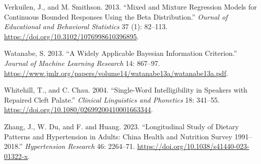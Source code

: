 \documentclass[
sn-apacite
]{sn-jnl}
\newlength{\cslhangindent}
\newenvironment{CSLReferences}[2] %
 {\begin{list}{}{%
  \setlength{\itemindent}{0pt}
  \setlength{\leftmargin}{0pt}
  \setlength{\parsep}{0pt}
  \ifodd #1
   \setlength{\leftmargin}{\cslhangindent}
   \setlength{\itemindent}{-1\cslhangindent}
  \fi
  \setlength{\itemsep}{#2\baselineskip}}}
 {\end{list}}
\begin{document}
\begin{CSLReferences}{1}{0}
Verkuilen, J., and M. Smithson. 2013. {``Mixed and Mixture Regression
Models for Continuous Bounded Responses Using the Beta Distribution.''}
\emph{Ournal of Educational and Behavioral Statistics} 37 (1): 82--113.
\url{https://doi.org/10.3102/1076998610396895}.

Watanabe, S. 2013. {``A Widely Applicable Bayesian Information
Criterion.''} \emph{Journal of Machine Learning Research} 14: 867--97.
\url{https://www.jmlr.org/papers/volume14/watanabe13a/watanabe13a.pdf}.

Whitehill, T., and C. Chau. 2004. {``Single-Word Intelligibility in
Speakers with Repaired Cleft Palate.''} \emph{Clinical Linguistics and
Phonetics} 18: 341--55.
\url{https://doi.org/10.1080/02699200410001663344}.

Zhang, J., W. Du, and F. and Huang. 2023. {``Longitudinal Study of
Dietary Patterns and Hypertension in Adults: China Health and Nutrition
Survey 1991--2018.''} \emph{Hypertension Research} 46: 2264--71.
\url{https://doi.org/10.1038/s41440-023-01322-x}.

\end{CSLReferences}
\end{document}
